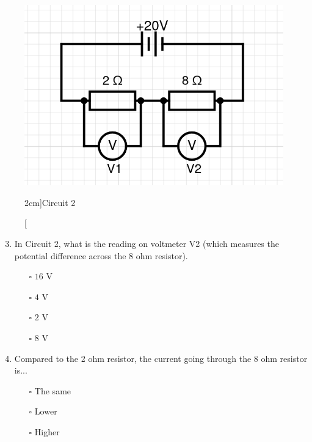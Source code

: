 \documentclass[a4paper,openany,nobib]{tufte-book}
\begin{document}
\begin{figure}[h!]
	\center
	\includegraphics[width=\linewidth]{circ2}
	\caption[][2cm]{Circuit 2}
\end{figure}
\begin{enumerate}
	\setcounter{enumi}{2}
	\item In Circuit 2, what is the reading on voltmeter V2 (which measures the potential difference across the 8 ohm resistor). 
		\begin{itemize}
			\item[$\square$]$16$ V
			\item[$\square$]$4$ V
			\item[$\square$]$2$ V
			\item[$\square$]$8$ V
		\end{itemize}
	\item Compared to the 2 ohm resistor, the current going through the 8 ohm resistor is...
	\begin{itemize}
		\item[$\square$] The same
		\item[$\square$] Lower
		\item[$\square$] Higher
	\end{itemize}
\end{enumerate}
\end{document}

